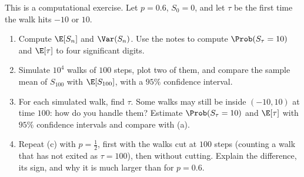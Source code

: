 \begin{exercise}\label{ex:mg-ruin-sim}
\medium This is a computational exercise. Let $p=0.6$, $S_0=0$, and let $\tau$ be the first
time the walk hits $-10$ or $10$.
\begin{enumerate}[label=(\alph*)]
  \item Compute $\E[S_n]$ and $\Var(S_n)$. Use the notes to compute $\Prob(S_\tau=10)$ and
    $\E[\tau]$ to four significant digits.
  \item Simulate $10^4$ walks of $100$ steps, plot two of them, and compare the sample mean of
    $S_{100}$ with $\E[S_{100}]$, with a $95\%$ confidence interval.
  \item For each simulated walk, find $\tau$. Some walks may still be inside $(-10,10)$ at time
    $100$: how do you handle them? Estimate $\Prob(S_\tau=10)$ and $\E[\tau]$ with $95\%$
    confidence intervals and compare with (a).
  \item Repeat (c) with $p=\frac12$, first with the walks cut at $100$ steps (counting a walk
    that has not exited as $\tau=100$), then without cutting. Explain the difference, its sign,
    and why it is much larger than for $p=0.6$.
\end{enumerate}
\end{exercise}
